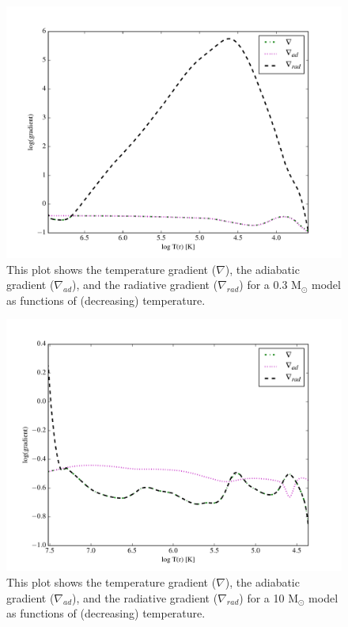 \documentclass[12pt]{article}
\begin{document}
\begin{figure}
  \centering
  \includegraphics[width=7.0in]{littlegrad.pdf}
  \caption {This plot shows the temperature gradient ($\nabla$),
  the adiabatic gradient ($\nabla_{ad}$), and the radiative gradient
  ($\nabla_{rad}$) for a 0.3 M$_{\odot}$ model as functions of
  (decreasing) temperature.}
  \label{littlegrad}
\end{figure}
\begin{figure}
  \centering
  \includegraphics[width=7.0in]{biggrad.pdf}
  \caption {This plot shows the temperature gradient ($\nabla$),
  the adiabatic gradient ($\nabla_{ad}$), and the radiative gradient
  ($\nabla_{rad}$) for a 10 M$_{\odot}$ model as functions of
  (decreasing) temperature.
  }
  \label{biggrad}
\end{figure}
\end{document}
